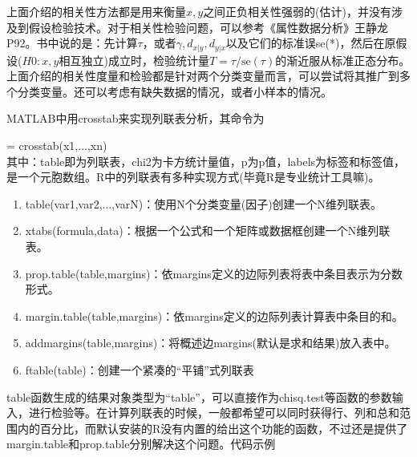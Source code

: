             上面介绍的相关性方法都是用来衡量$x,y$之间正负相关性强弱的(估计)，并没有涉及到假设检验技术。对于相关性检验问题，可以参考《属性数据分析》王静龙P92。书中说的是：先计算$\tau$，或者$\gamma,d_{x|y},d_{y|x}$以及它们的标准误se(*)，然后在原假设($H0:x,y$相互独立)成立时，检验统计量$T = \tau/\mathrm{se}(\tau)$的渐近服从标准正态分布。上面介绍的相关性度量和检验都是针对两个分类变量而言，可以尝试将其推广到多个分类变量。还可以考虑有缺失数据的情况，或者小样本的情况。
            \par
            MATLAB中用crosstab来实现列联表分析，其命令为
            \par
            [table,chi2,p,labels] = crosstab(x1,...,xn)\\
            其中：table即为列联表，chi2为卡方统计量值，p为p值，labels为标签和标签值，是一个元胞数组。R中的列联表有多种实现方式(毕竟R是专业统计工具嘛)。
            \begin{enumerate}
            \item table(var1,var2,$\dots$,varN)：使用N个分类变量(因子)创建一个N维列联表。
            \item xtabs(formula,data)：根据一个公式和一个矩阵或数据框创建一个N维列联表。
            \item prop.table(table,margins)：依margins定义的边际列表将表中条目表示为分数形式。
            \item margin.table(table,margins)：依margins定义的边际列表计算表中条目的和。
            \item addmargins(table,margins)：将概述边margins(默认是求和结果)放入表中。
            \item ftable(table)：创建一个紧凑的“平铺”式列联表
            \end{enumerate}
            \par
            table函数生成的结果对象类型为“table”，可以直接作为chisq.test等函数的参数输入，进行检验等。在计算列联表的时候，一般都希望可以同时获得行、列和总和范围内的百分比，而默认安装的R没有内置的给出这个功能的函数，不过还是提供了margin.table和prop.table分别解决这个问题。代码示例
